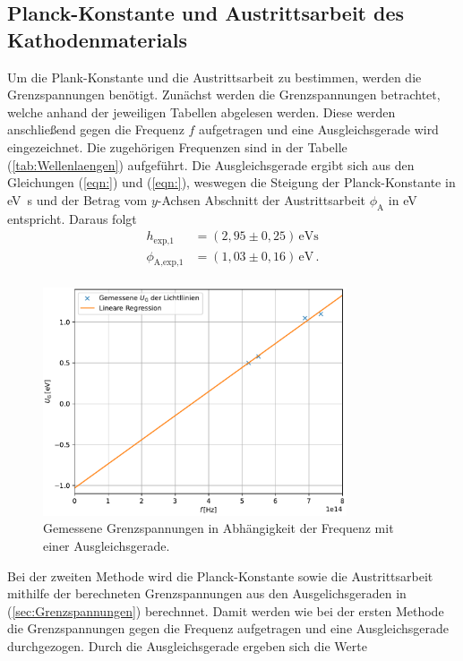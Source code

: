 \subsection{Planck-Konstante und Austrittsarbeit des Kathodenmaterials}
Um die Plank-Konstante und die Austrittsarbeit zu bestimmen, werden die Grenzspannungen benötigt.
Zunächst werden die Grenzspannungen betrachtet, welche anhand der jeweiligen Tabellen abgelesen werden. 
Diese werden anschließend gegen die Frequenz $f$ aufgetragen und eine Ausgleichsgerade wird eingezeichnet.
Die zugehörigen Frequenzen sind in der Tabelle (\ref{tab:Wellenlaengen}) aufgeführt.
Die Ausgleichsgerade ergibt sich aus den Gleichungen (\ref{eqn:}) und (\ref{eqn:}), weswegen die Steigung der Planck-Konstante in 
\unit{\eV\second} und der Betrag vom $y$-Achsen Abschnitt der Austrittsarbeit $\phi_{\text{A}}$ in \unit{\eV} entspricht. Daraus folgt
\begin{align*}
    h_{\text{exp,}1} &= (2,95 \pm 0,25)\,\unit{\eV\second}\\
    \phi_{\text{A,exp,}1} &= (1,03 \pm 0,16) \, \unit{\eV}\,.\\
\end{align*}
\begin{figure}[H]
    \centering
    \includegraphics[width=0.8\textwidth]{Plots/planck_gemessen.pdf}
    \caption{Gemessene Grenzspannungen in Abhängigkeit der Frequenz mit einer Ausgleichsgerade.}
    \label{fig:Planck_gemessen}
\end{figure}
Bei der zweiten Methode wird die Planck-Konstante sowie die Austrittsarbeit mithilfe der berechneten Grenzspannungen
aus den Ausgelichsgeraden in (\ref{sec:Grenzspannungen}) berechnnet. Damit werden wie bei der ersten Methode die Grenzspannungen
gegen die Frequenz aufgetragen und eine Ausgleichsgerade durchgezogen. Durch die Ausgleichsgerade ergeben sich die Werte 
